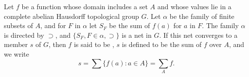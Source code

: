 Let $f$ be a function whose domain includes a set $A$ and whose values lie in a complete abelian Hausdorff topological group $G$. Let $\alpha$ be the family of finite subsets of $A$, and for $F$ in $\alpha$ let $S_F$ be the sum of $f(a)$ for $a$ in $F$. The family $\alpha$ is directed by $\supset$, and $\{S_F, F \in \alpha, \supset\}$ is a net in $G$. If this net converges to a member $s$ of $G$, then $f$ is said to be , $s$ is defined to be the sum of $f$ over $A$, and we write $$s = \sum \{f(a): a \in A\} = \sum_A f.$$
